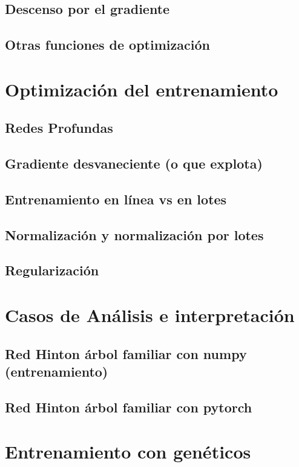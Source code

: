\documentclass[12pt,openany]{book}
\begin{document}
\section{Descenso por el gradiente}
\section{Otras funciones de optimización}

\chapter{Optimización del entrenamiento} 
\section{Redes Profundas}
\section{Gradiente desvaneciente (o que explota) }
\section{Entrenamiento en línea vs en lotes}
\section{Normalización y normalización por lotes}
\section{Regularización}

\chapter{Casos de Análisis e interpretación}

\section{Red Hinton árbol familiar con numpy (entrenamiento)}

\section{Red Hinton árbol familiar con pytorch}

\chapter{Entrenamiento con genéticos}
\end{document}
